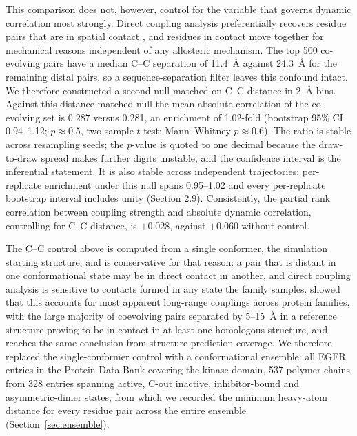 \documentclass[utf8]{FrontiersinHarvard}
\begin{document}
This comparison does not, however, control for the variable that governs dynamic correlation most strongly. Direct coupling analysis preferentially recovers residue pairs that are in spatial contact \citep{Morcos2011}, and residues in contact move together for mechanical reasons independent of any allosteric mechanism. The top 500 co-evolving pairs have a median C\textalpha{}--C\textalpha{} separation of 11.4~\AA{} against 24.3~\AA{} for the remaining distal pairs, so a sequence-separation filter leaves this confound intact. We therefore constructed a second null matched on C\textalpha{}--C\textalpha{} distance in 2~\AA{} bins. Against this distance-matched null the mean absolute correlation of the co-evolving set is 0.287 versus 0.281, an enrichment of 1.02-fold (bootstrap 95\% CI 0.94--1.12; $p \approx 0.5$, two-sample $t$-test; Mann--Whitney $p \approx 0.6$). The ratio is stable across resampling seeds; the $p$-value is quoted to one decimal because the draw-to-draw spread makes further digits unstable, and the confidence interval is the inferential statement. It is also stable across independent trajectories: per-replicate enrichment under this null spans 0.95--1.02 and every per-replicate bootstrap interval includes unity (Section 2.9). Consistently, the partial rank correlation between coupling strength and absolute dynamic correlation, controlling for C\textalpha{}--C\textalpha{} distance, is $+0.028$, against $+0.060$ without control.

The C\textalpha{}--C\textalpha{} control above is computed from a single conformer, the simulation starting structure, and is conservative for that reason: a pair that is distant in one conformational state may be in direct contact in another, and direct coupling analysis is sensitive to contacts formed in any state the family samples. \citet{Anishchenko2017} showed that this accounts for most apparent long-range couplings across protein families, with the large majority of coevolving pairs separated by 5--15~\AA{} in a reference structure proving to be in contact in at least one homologous structure, and \citet{Karamanos2023} reaches the same conclusion from structure-prediction coverage. We therefore replaced the single-conformer control with a conformational ensemble: all EGFR entries in the Protein Data Bank covering the kinase domain, 537 polymer chains from 328 entries spanning active, \textalpha{}C-out inactive, inhibitor-bound and asymmetric-dimer states, from which we recorded the minimum heavy-atom distance for every residue pair across the entire ensemble (Section~\ref{sec:ensemble}).
\end{document}
